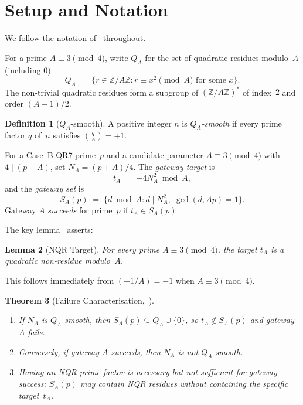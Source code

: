 \documentclass[12pt]{amsart}
\newtheorem{theorem}{Theorem}[section]
\newtheorem{lemma}[theorem]{Lemma}
\theoremstyle{definition}
\newtheorem{definition}[theorem]{Definition}
\theoremstyle{remark}
\newcommand{\leg}[2]{\left(\frac{#1}{#2}\right)}
\begin{document}
\section{Setup and Notation}\label{sec:setup}

We follow the notation of~\cite{ES-paper,closure-paper} throughout.

For a prime $A \equiv 3 \pmod{4}$, write $Q_A$ for the set of
quadratic residues modulo~$A$ (including $0$):
\[
  Q_A \;=\; \{r \in \mathbb{Z}/A\mathbb{Z} : r \equiv x^2 \pmod{A}
  \text{ for some } x\}.
\]
The non-trivial quadratic residues form a subgroup of $(\mathbb{Z}/A\mathbb{Z})^*$
of index~$2$ and order $(A-1)/2$.

\begin{definition}[$Q_A$-smooth]
A positive integer $n$ is \emph{$Q_A$-smooth} if every prime factor $q$
of~$n$ satisfies $\leg{q}{A} = +1$.
\end{definition}

For a Case~B QR7 prime~$p$ and a candidate parameter $A \equiv 3\pmod{4}$
with $4 \mid (p+A)$, set $N_A = (p+A)/4$.  The \emph{gateway target} is
\[
  t_A \;=\; {-4N_A^2} \bmod A,
\]
and the \emph{gateway set} is
\[
  S_A(p) \;=\; \bigl\{d \bmod A : d \mid N_A^2,\; \gcd(d, Ap) = 1\bigr\}.
\]
Gateway $A$ \emph{succeeds} for prime~$p$ if $t_A \in S_A(p)$.

The key lemma~\cite[Lemma~3.1]{ES-paper} asserts:
\begin{lemma}[NQR Target]\label{lem:nqr-target}
For every prime $A \equiv 3 \pmod{4}$, the target $t_A$ is a quadratic
non-residue modulo~$A$.
\end{lemma}
This follows immediately from $(-1/A) = -1$ when $A \equiv 3 \pmod{4}$.

\begin{theorem}[Failure Characterisation,~{\cite[Theorem~3.2]{closure-paper}}]
\label{thm:fc}
\begin{enumerate}[label=\textup{(\roman*)}]
  \item If $N_A$ is $Q_A$-smooth, then $S_A(p) \subseteq Q_A \cup \{0\}$,
    so $t_A \notin S_A(p)$ and gateway $A$ fails.
  \item Conversely, if gateway $A$ succeeds, then $N_A$ is not $Q_A$-smooth.
  \item Having an NQR prime factor is necessary but not sufficient
    for gateway success: $S_A(p)$ may contain NQR residues without
    containing the specific target~$t_A$.
\end{enumerate}
\end{theorem}
\end{document}
